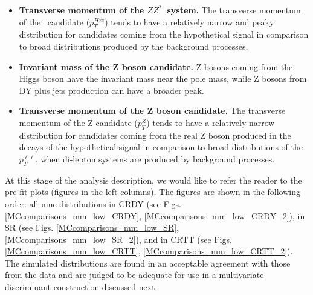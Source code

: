 \begin{itemize}
\item{\bfseries Transverse momentum of the $ZZ^*$~system.} 
The transverse momentum of the \HZZ~candidate ($p_T^{Hzz}$) tends to have a relatively narrow and peaky distribution for candidates coming from the hypothetical signal in comparison to broad distributions produced by the background processes. 

\item{\bfseries Invariant mass of the Z boson candidate.} 
Z bosons coming from the Higgs boson have the invariant mass near the pole mass, while Z bosons from DY plus jets production can have a broader peak.

\item{\bfseries Transverse momentum of the Z boson candidate.} 
The transverse momentum of the Z candidate ($p_T^Z$) tends to have a relatively narrow distribution for candidates coming from the real Z boson produced in the decays of the hypothetical signal in comparison to broad distributions of the $p_T^{\ell\ell}$, when di-lepton systems are produced by background processes. 

\end{itemize}

At this stage of the analysis description, we would like to refer the reader to the pre-fit plots (figures in the left columns). The figures are shown in the following order: all nine distributions in CRDY (see Figs. \ref{MCcomparisons_mm_low_CRDY}, \ref{MCcomparisons_mm_low_CRDY_2}), in SR (see Figs. \ref{MCcomparisons_mm_low_SR}, \ref{MCcomparisons_mm_low_SR_2}), and in CRTT (see Figs. \ref{MCcomparisons_mm_low_CRTT}, \ref{MCcomparisons_mm_low_CRTT_2}). The simulated distributions are found in an acceptable agreement with those from the data and are judged to be adequate for use in a multivariate discriminant construction discussed next. 

